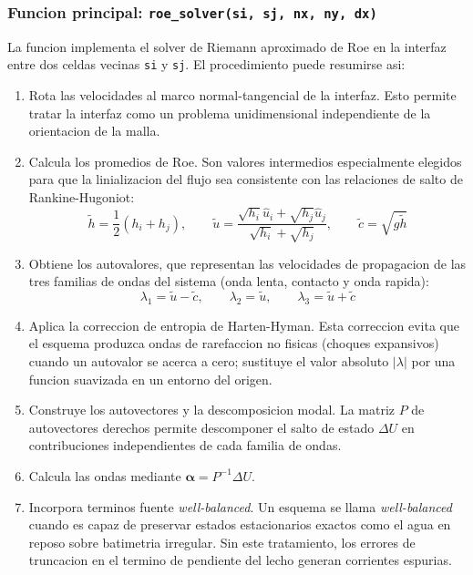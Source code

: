 \documentclass[11pt,a4paper]{article}
\newcommand{\code}[1]{\texttt{#1}}
\begin{document}
\subsubsection{Funcion principal: \code{roe\_solver(si, sj, nx, ny, dx)}}

La funcion implementa el solver de Riemann aproximado de Roe en la interfaz entre dos celdas vecinas
\code{si} y \code{sj}. El procedimiento puede resumirse asi:

\begin{enumerate}[leftmargin=1.8em]
  \item Rota las velocidades al marco normal-tangencial de la interfaz. Esto permite tratar
  la interfaz como un problema unidimensional independiente de la orientacion de la malla.
  \item Calcula los promedios de Roe. Son valores intermedios especialmente elegidos para que la
  linializacion del flujo sea consistente con las relaciones de salto de Rankine-Hugoniot:
  \[
    \tilde{h} = \frac{1}{2}(h_i + h_j), \qquad
    \tilde{u} = \frac{\sqrt{h_i}\hat{u}_i + \sqrt{h_j}\hat{u}_j}{\sqrt{h_i} + \sqrt{h_j}}, \qquad
    \tilde{c} = \sqrt{g\tilde{h}}
  \]
  \item Obtiene los autovalores, que representan las velocidades de propagacion de las tres
  familias de ondas del sistema (onda lenta, contacto y onda rapida):
  \[
    \lambda_1 = \tilde{u} - \tilde{c}, \qquad
    \lambda_2 = \tilde{u}, \qquad
    \lambda_3 = \tilde{u} + \tilde{c}
  \]
  \item Aplica la correccion de entropia de Harten-Hyman. Esta correccion evita que el esquema
  produzca ondas de rarefaccion no fisicas (choques expansivos) cuando un autovalor se acerca
  a cero; sustituye el valor absoluto $|\lambda|$ por una funcion suavizada en un entorno
  del origen.
  \item Construye los autovectores y la descomposicion modal. La matriz $P$ de autovectores
  derechos permite descomponer el salto de estado $\Delta U$ en contribuciones independientes
  de cada familia de ondas.
  \item Calcula las ondas mediante $\boldsymbol{\alpha} = P^{-1}\Delta U$.
  \item Incorpora terminos fuente \emph{well-balanced}. Un esquema se llama
  \emph{well-balanced} cuando es capaz de preservar estados estacionarios exactos como
  el agua en reposo sobre batimetria irregular. Sin este tratamiento, los errores de
  truncacion en el termino de pendiente del lecho generan corrientes espurias.
    \begin{itemize}

\end{itemize}
\end{enumerate}
\end{document}
